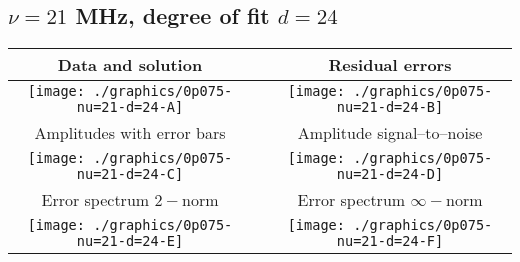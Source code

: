 

% 

\clearpage{}
\break{}

\subsection{$\nu = 21$ MHz, degree of fit $d = 24$}

\begin{table}[h]
    \begin{center}
        \begin{tabular}{ccc}
            Data and solution & \quad & Residual errors \\\hline
            \texttt{[image: ./graphics/0p075-nu=21-d=24-A]} &&
            \texttt{[image: ./graphics/0p075-nu=21-d=24-B]} \\[15pt]
            Amplitudes with error bars && Amplitude signal--to--noise \\\hline
            \texttt{[image: ./graphics/0p075-nu=21-d=24-C]} &&
            \texttt{[image: ./graphics/0p075-nu=21-d=24-D]} \\[15pt]
            Error spectrum $2-$norm && Error spectrum $\infty-$norm \\\hline
            \texttt{[image: ./graphics/0p075-nu=21-d=24-E]} &&
            \texttt{[image: ./graphics/0p075-nu=21-d=24-F]} \\[15pt]
        \end{tabular}
    \end{center}
\label{fig:elev=75, nu=21}
\end{table}



\endinput

